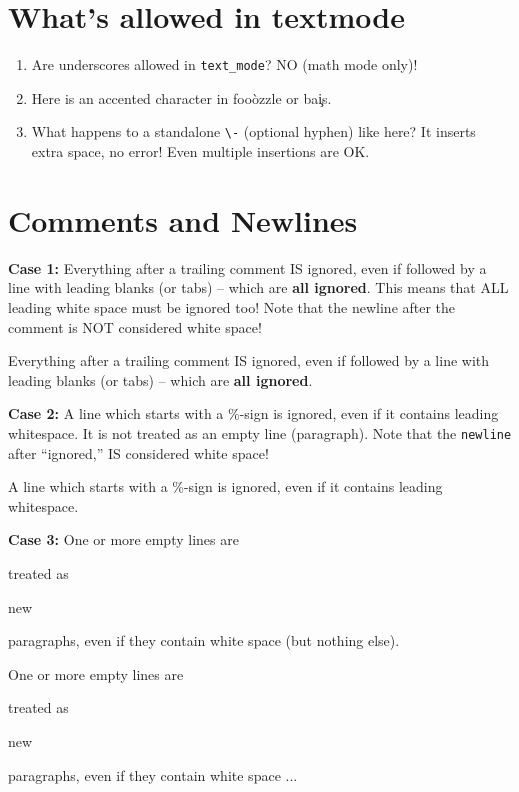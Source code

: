 \documentclass[a4paper]{article}
\begin{document}
\section{What's allowed in textmode}

\begin{enumerate}
\item
	Are underscores allowed in \verb!text_mode!? NO (math mode only)!
\item
	Here is an accented character in foo\`{o}zzle or ba\c is.
\item
	What happens to a standalone \verb!\-! (optional hyphen) like \- here? 
	It inserts extra space, no error!
	Even multiple insertions \-\-\-\- are OK.
\end{enumerate}

\section{Comments and Newlines}

\noindent\textbf{Case 1:}
Everything after a trailing {\color{blue}comment%
    IS} ignored, even if followed by a line with leading blanks (or tabs) -- 
which are \textbf{all ignored}.
This means that ALL leading white space must be ignored too!
Note that the newline after the comment is NOT considered white space!
\begin{verbatim*}
Everything after a trailing {\color{blue}comment%comment
    IS} ignored, even if followed by a line with leading blanks 
(or tabs) -- which are \textbf{all ignored}.
\end{verbatim*}

\bigskip\noindent\textbf{Case 2:}	
A line which starts with a \%-sign is {\color{blue}ignored,
even} if it contains leading whitespace. It is not treated as an empty line (paragraph).
Note that the \texttt{newline} after ``ignored,'' IS considered white space!
\begin{verbatim*}
A line which starts with a \%-sign is {\color{blue}ignored,
      %
even} if it contains leading whitespace.
\end{verbatim*}

\bigskip\noindent\textbf{Case 3:}
One or more empty lines are {\color{blue}treated as
    
new} paragraphs, even if they contain white space (but nothing else).
\begin{verbatim*}
One or more empty lines are {\color{blue}treated as
    
new} paragraphs, even if they contain white space ...
\end{verbatim*}
\end{document}
